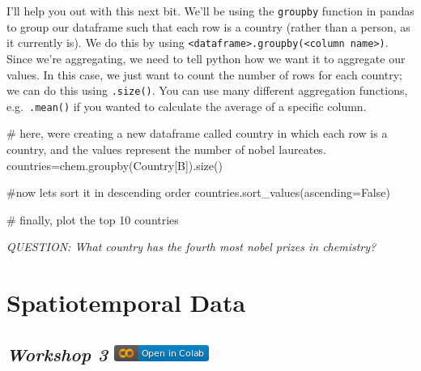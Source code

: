 \documentclass[
  letterpaper,
  DIV=11,
  numbers=noendperiod]{scrreprt}
\newenvironment{Shaded}{\begin{snugshade}}{\end{snugshade}}
\newcommand{\CommentTok}[1]{\textcolor[rgb]{0.37,0.37,0.37}{#1}}
\newcommand{\NormalTok}[1]{\textcolor[rgb]{0.00,0.23,0.31}{#1}}
\newcommand{\OperatorTok}[1]{\textcolor[rgb]{0.37,0.37,0.37}{#1}}
\newcommand{\StringTok}[1]{\textcolor[rgb]{0.13,0.47,0.30}{#1}}
\newcommand{\VariableTok}[1]{\textcolor[rgb]{0.07,0.07,0.07}{#1}}
\begin{document}
I'll help you out with this next bit. We'll be using the
\texttt{groupby} function in pandas to group our dataframe such that
each row is a country (rather than a person, as it currently is). We do
this by using
\texttt{\textless{}dataframe\textgreater{}.groupby(\textquotesingle{}\textless{}column\ name\textgreater{}\textquotesingle{})}.
Since we're aggregating, we need to tell python how we want it to
aggregate our values. In this case, we just want to count the number of
rows for each country; we can do this using \texttt{.size()}. You can
use many different aggregation functions, e.g.~\texttt{.mean()} if you
wanted to calculate the average of a specific column.

\begin{Shaded}
\begin{Highlighting}[]
\CommentTok{\# here, we\textquotesingle{}re creating a new dataframe called \textquotesingle{}country\textquotesingle{} in which each row is a country, and the values represent the number of nobel laureates. }
\NormalTok{countries}\OperatorTok{=}\NormalTok{chem.groupby(}\StringTok{\textquotesingle{}Country[B]\textquotesingle{}}\NormalTok{).size()}

\CommentTok{\#now let\textquotesingle{}s sort it in descending order}
\NormalTok{countries.sort\_values(ascending}\OperatorTok{=}\VariableTok{False}\NormalTok{)}

\CommentTok{\# finally, plot the top 10 countries }
\end{Highlighting}
\end{Shaded}

\emph{QUESTION: What country has the fourth most nobel prizes in
chemistry?}


\hypertarget{spatiotemporal-data}{%
\chapter{Spatiotemporal Data}\label{spatiotemporal-data}}

\hypertarget{workshop-3-open-in-colab}{%
\section[\emph{Workshop 3} ]{\texorpdfstring{\emph{Workshop 3}
\href{https://colab.research.google.com/github/oballinger/QM2/blob/main/notebooks/W03.\%20Spatial\%20Data.ipynb}{\protect\includegraphics{index_files/mediabag/colab-badge.png}}}{Workshop 3 Open In Colab}}\label{workshop-3-open-in-colab}}
\end{document}
